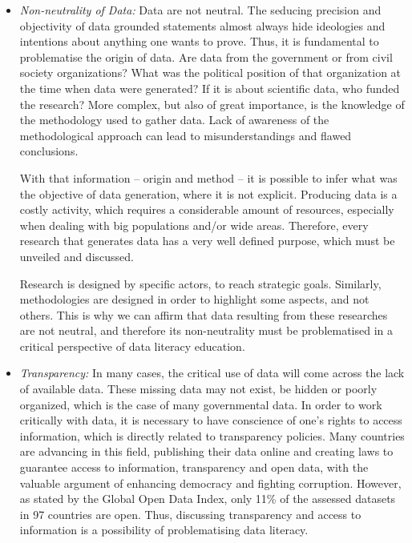 \begin{itemize}
\item \emph{Non-neutrality of Data:} Data are not neutral. The seducing precision and objectivity of data grounded statements almost always hide ideologies and intentions about anything one wants to prove. Thus, it is fundamental to problematise the origin of data. Are data from the government or from civil society organizations? What was the political position of that organization at the time when data were generated? If it is about scientific data, who funded the research? More complex, but also of great importance, is the knowledge of the methodology used to gather data. Lack of awareness of the methodological approach can lead to misunderstandings and flawed conclusions. 

With that information – origin and method – it is possible to infer what was the objective of data generation, where it is not explicit. Producing data is a costly activity, which requires a considerable amount of resources, especially when dealing with big populations and/or wide areas. Therefore, every research that generates data has a very well defined purpose, which must be unveiled and discussed.

Research is designed by specific actors, to reach strategic goals. Similarly, methodologies are designed in order to highlight some aspects, and not others. This is why we can affirm that data resulting from these researches are not neutral, and therefore its non-neutrality must be problematised in a critical perspective of data literacy education.

\item \emph{Transparency:} In many cases, the critical use of data will come across the lack of available data. These missing data may not exist, be hidden or poorly organized, which is the case of many governmental data. In order to work critically with data, it is necessary to have conscience of one's rights to access information, which is directly related to transparency policies. Many countries are advancing in this field, publishing their data online and creating laws to guarantee access to information, transparency and open data, with the valuable argument of enhancing democracy and fighting corruption. However, as stated by the Global Open Data Index, only 11\% of the assessed datasets in 97 countries are open. Thus, discussing transparency and access to information is a possibility of problematising data literacy.  

\end{itemize}

